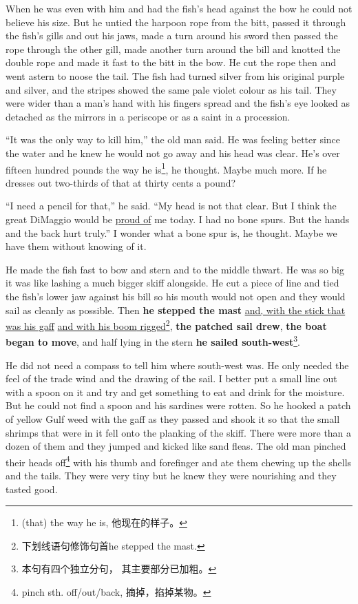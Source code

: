 \documentclass[fontset=ubuntu,zihao=-4]{ctexrep}
\begin{document}
When he was even with him and had the fish's head against the bow he could
not believe his size. But he \gls{untied} the harpoon rope from the bitt,
passed it through the fish's gills and out his jaws, made a turn around his
\gls{sword} then passed the rope through the other gill, made another turn
around the bill and knotted the double rope and made it fast to the bitt in
the bow. He cut the rope then and went astern to noose the tail. The fish
had turned silver from his \gls{original} purple and silver, and the stripes
showed the same pale \gls{violet} colour as his tail. They were wider than a
man's hand with his fingers spread and the fish's eye looked as
\gls{detached} as the mirrors in a \gls{periscope} or as a \gls{saint} in a
\gls{procession}.

``It was the only way to kill him,'' the old man said. He was feeling better
since the water and he knew he would not go away and his head was clear.
He's over fifteen hundred pounds the way he is\footnote{(that) the way he
  is, 他现在的样子。}, he thought. Maybe much more. If he dresses out
two-thirds of that at thirty cents a pound?

``I need a pencil for that,'' he said. ``My head is not that clear. But I
think the great DiMaggio would be \uline{proud of} me today. I had no bone spurs.
But the hands and the back hurt truly.'' I wonder what a bone spur is, he
thought. Maybe we have them without knowing of it.

He made the fish fast to bow and stern and to the middle thwart. He was so
big it was like lashing a much bigger skiff alongside. He cut a piece of
line and tied the fish's lower jaw against his bill so his mouth would not
open and they would sail as cleanly as possible. Then \textbf{he stepped the
  mast} \uline{and, with the stick that was his gaff} \uline{and with his
  \gls{boom} rigged}\footnote{下划线语句修饰句首he stepped the mast.},
\textbf{the patched sail drew}, \textbf{the boat began to move}, and half
lying in the stern \textbf{he sailed south-west}\footnote{本句有四个独立分句，
  其主要部分已加粗。}.

He did not need a \gls{compass} to tell him where south-west was. He only
needed the feel of the trade wind and the drawing of the sail. I better put
a small line out with a spoon on it and try and get something to eat and
drink for the \gls{moisture}. But he could not find a spoon and his sardines
were \gls{rotten}. So he hooked a patch of yellow Gulf weed with the gaff as
they passed and shook it so that the small shrimps that were in it fell onto
the planking of the skiff. There were more than a dozen of them and they
jumped and kicked like sand \glspl{flea}. The old man \gls{pinched} their
heads off\footnote{pinch sth. off/out/back, 摘掉，掐掉某物。} with his thumb
and forefinger and ate them chewing up the shells and the tails. They were
very tiny but he knew they were \gls{nourishing} and they tasted good.
\end{document}
